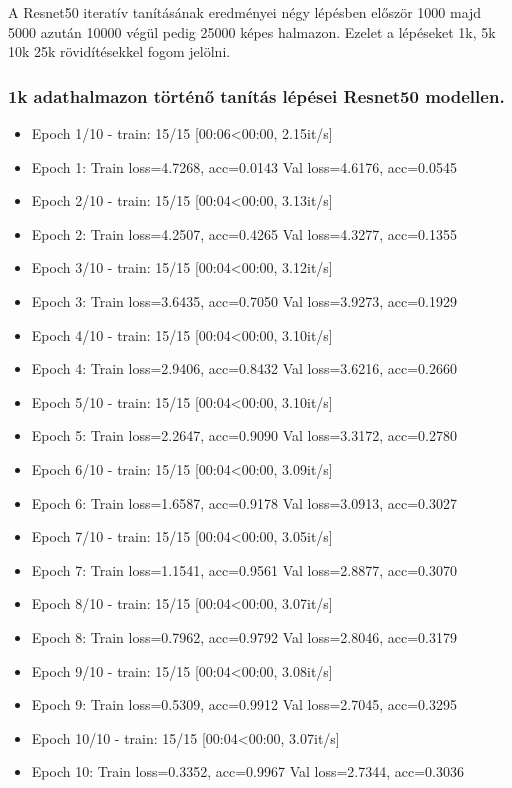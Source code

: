 A Resnet50 iteratív tanításának eredményei négy lépésben először 1000 majd 5000 azután 10000 végül pedig 25000 képes halmazon. Ezelet a lépéseket 1k, 5k 10k 25k rövidítésekkel fogom jelölni.

\subsubsection{1k adathalmazon történő tanítás lépései Resnet50 modellen.}
  \begin{itemize} 
    \item Epoch 1/10 - train: 15/15 [00:06<00:00, 2.15it/s]
    \item Epoch 1: Train loss=4.7268, acc=0.0143 Val loss=4.6176, acc=0.0545
    \item Epoch 2/10 - train: 15/15 [00:04<00:00, 3.13it/s]
    \item Epoch 2: Train loss=4.2507, acc=0.4265 Val loss=4.3277, acc=0.1355
    \item Epoch 3/10 - train: 15/15 [00:04<00:00, 3.12it/s]
    \item Epoch 3: Train loss=3.6435, acc=0.7050 Val loss=3.9273, acc=0.1929
    \item Epoch 4/10 - train: 15/15 [00:04<00:00, 3.10it/s]
    \item Epoch 4: Train loss=2.9406, acc=0.8432 Val loss=3.6216, acc=0.2660
    \item Epoch 5/10 - train: 15/15 [00:04<00:00, 3.10it/s]
    \item Epoch 5: Train loss=2.2647, acc=0.9090 Val loss=3.3172, acc=0.2780
    \item Epoch 6/10 - train: 15/15 [00:04<00:00, 3.09it/s]
    \item Epoch 6: Train loss=1.6587, acc=0.9178 Val loss=3.0913, acc=0.3027
    \item Epoch 7/10 - train: 15/15 [00:04<00:00, 3.05it/s]
    \item Epoch 7: Train loss=1.1541, acc=0.9561 Val loss=2.8877, acc=0.3070
    \item Epoch 8/10 - train: 15/15 [00:04<00:00, 3.07it/s]
    \item Epoch 8: Train loss=0.7962, acc=0.9792 Val loss=2.8046, acc=0.3179
    \item Epoch 9/10 - train: 15/15 [00:04<00:00, 3.08it/s]
    \item Epoch 9: Train loss=0.5309, acc=0.9912 Val loss=2.7045, acc=0.3295
    \item Epoch 10/10 - train: 15/15 [00:04<00:00, 3.07it/s]
    \item Epoch 10: Train loss=0.3352, acc=0.9967 Val loss=2.7344, acc=0.3036
  \end{itemize}

